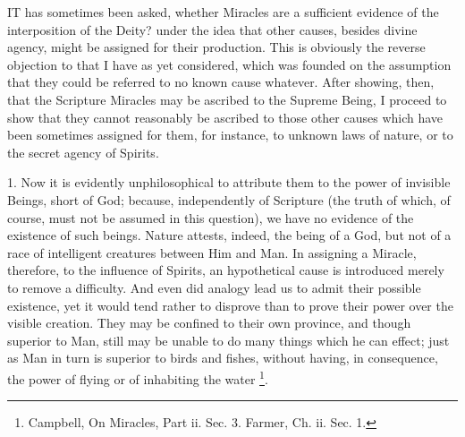 
IT has
sometimes been asked, whether Miracles are a sufficient evidence of
the interposition of the Deity? under the idea that other causes,
besides divine agency, might be assigned for their production. This is
obviously the reverse objection to that I have as yet considered,
which was founded on the assumption that they could be referred to no
known cause whatever. After showing, then, that the Scripture Miracles
may be ascribed to the Supreme Being, I proceed to show that they
cannot reasonably be ascribed to those other causes which have been
sometimes assigned for them, for instance, to unknown laws of nature,
or to the secret agency of Spirits.

1. Now it is evidently unphilosophical to
attribute them to the power of invisible Beings, short of God;
because, independently of Scripture (the truth of which, of course,
must not be assumed in this question), we have no evidence of the
existence of such beings. Nature attests, indeed, the being of a
God, but not of a race of intelligent creatures between Him and Man.
In assigning a Miracle, therefore, to the influence of Spirits, an
hypothetical cause is introduced merely to remove a difficulty. And
even did analogy lead us to admit their possible existence, yet it
would tend rather to disprove than to prove their power over the
visible creation. They may be confined to their own province, and
though superior to Man, still may be unable to do many things which he
can effect; just as Man in turn is superior to birds and fishes,
without having, in consequence, the power of flying or of inhabiting
the water \footnote{Campbell, On Miracles, Part ii. Sec. 3.
Farmer, Ch. ii. Sec. 1.}.

